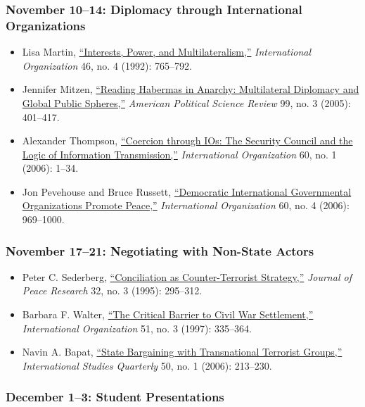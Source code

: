 \subsubsection{November 10--14: Diplomacy through International
Organizations}\label{november-1014-diplomacy-through-international-organizations}

\begin{itemize}
\item
  Lisa Martin, \href{http://www.jstor.org/stable/2706874}{``Interests,
  Power, and Multilateralism,''} \emph{International Organization} 46,
  no. 4 (1992): 765--792.
\item
  Jennifer Mitzen, \href{http://www.jstor.org/stable/30038948}{``Reading
  Habermas in Anarchy: Multilateral Diplomacy and Global Public
  Spheres,''} \emph{American Political Science Review} 99, no. 3 (2005):
  401--417.
\item
  Alexander Thompson,
  \href{http://www.jstor.org/stable/3877866}{``Coercion through IOs: The
  Security Council and the Logic of Information Transmission,''}
  \emph{International Organization} 60, no. 1 (2006): 1--34.
\item
  Jon Pevehouse and Bruce Russett,
  \href{http://www.jstor.org/stable/3877853}{``Democratic International
  Governmental Organizations Promote Peace,''} \emph{International
  Organization} 60, no. 4 (2006): 969--1000.
\end{itemize}

\subsubsection{November 17--21: Negotiating with Non-State
Actors}\label{november-1721-negotiating-with-non-state-actors}

\begin{itemize}
\item
  Peter C. Sederberg,
  \href{http://www.jstor.org/stable/425666}{``Conciliation as
  Counter-Terrorist Strategy,''} \emph{Journal of Peace Research} 32,
  no. 3 (1995): 295--312.
\item
  Barbara F. Walter, \href{http://www.jstor.org/stable/2703607}{``The
  Critical Barrier to Civil War Settlement,''} \emph{International
  Organization} 51, no. 3 (1997): 335--364.
\item
  Navin A. Bapat, \href{http://www.jstor.org/stable/3693558}{``State
  Bargaining with Transnational Terrorist Groups,''} \emph{International
  Studies Quarterly} 50, no. 1 (2006): 213--230.
\end{itemize}

\subsubsection{December 1--3: Student
Presentations}\label{december-13-student-presentations}
